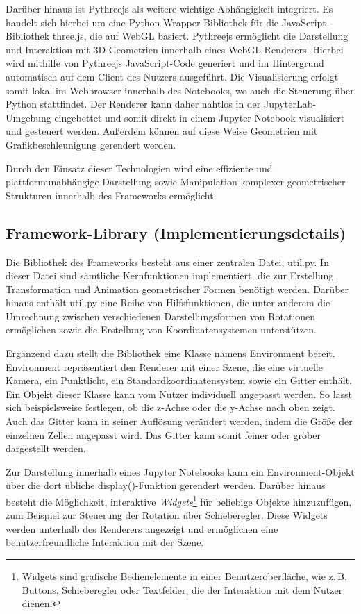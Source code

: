 Darüber hinaus ist Pythreejs als weitere wichtige Abhängigkeit integriert.
Es handelt sich hierbei um eine Python-Wrapper-Bibliothek für die JavaScript-Bibliothek three.js, die auf WebGL basiert.
Pythreejs ermöglicht die Darstellung und Interaktion mit 3D-Geometrien innerhalb eines WebGL-Renderers.
Hierbei wird mithilfe von Pythreejs JavaScript-Code generiert und im Hintergrund automatisch auf dem Client des Nutzers ausgeführt.
Die Visualisierung erfolgt somit lokal im Webbrowser innerhalb des Notebooks, wo auch die Steuerung über Python stattfindet.
Der Renderer kann daher nahtlos in der JupyterLab-Umgebung eingebettet und somit direkt in einem Jupyter Notebook visualisiert und gesteuert werden.
Außerdem können auf diese Weise Geometrien mit Grafikbeschleunigung gerendert werden. 

Durch den Einsatz dieser Technologien wird eine effiziente und platt\-form\-un\-ab\-hängige Darstellung sowie Manipulation komplexer
geometrischer Strukturen innerhalb des Frameworks ermöglicht.




\subsection{Framework-Library (Implementierungsdetails)}
Die Bibliothek des Frameworks besteht aus einer zentralen Datei, util.py.
In dieser Datei sind sämtliche Kernfunktionen implementiert, die zur Erstellung, Transformation und Animation geometrischer Formen benötigt werden.
Darüber hinaus enthält util.py eine Reihe von Hilfsfunktionen,
die unter anderem die Umrechnung zwischen verschiedenen Darstellungsformen von Rotationen ermöglichen sowie die Erstellung von Koordinatensystemen unterstützen.

Ergänzend dazu stellt die Bibliothek eine Klasse namens Environment bereit.
Environment repräsentiert den Renderer mit einer Szene, die eine virtuelle Kamera, ein Punktlicht,
ein Standardkoordinatensystem sowie ein Gitter enthält. Ein Objekt dieser Klasse kann vom Nutzer individuell angepasst werden.
So lässt sich beispielsweise festlegen, ob die z-Achse oder die y-Achse nach oben zeigt.
Auch das Gitter kann in seiner Auflösung verändert werden, indem die Größe der einzelnen Zellen angepasst wird.
Das Gitter kann somit feiner oder gröber dargestellt werden.

Zur Darstellung innerhalb eines Jupyter Notebooks kann ein Environment-Objekt über die dort übliche display()-Funktion gerendert werden.
Darüber hinaus besteht die Möglichkeit, interaktive \textit{Widgets}\footnote{Widgets sind grafische Bedienelemente in einer Benutzeroberfläche,
wie z.\,B. Buttons, Schieberegler oder Textfelder, die der Interaktion mit dem Nutzer dienen.} für beliebige Objekte hinzuzufügen, zum Beispiel zur Steuerung der Rotation über Schieberegler.
Diese Widgets werden unterhalb des Renderers angezeigt und ermöglichen eine benutzerfreundliche Interaktion mit der Szene.

